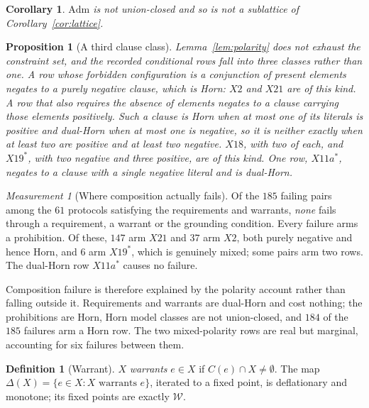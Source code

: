 \documentclass[11pt,reqno]{amsart}
\theoremstyle{plain}
\newtheorem{proposition}[theorem]{Proposition}
\newtheorem{corollary}[theorem]{Corollary}
\theoremstyle{definition}
\newtheorem{definition}[theorem]{Definition}
\theoremstyle{remark}
\newtheorem{measurement}[theorem]{Measurement}
\newcommand{\Admf}{\mathrm{Adm}}
\begin{document}
\begin{corollary}\label{cor:admnotlattice}
$\Admf$ is not union-closed and so is not a sublattice of
Corollary~\ref{cor:lattice}.
\end{corollary}

\begin{proposition}[A third clause class]\label{prop:mixed}
Lemma~\ref{lem:polarity} does not exhaust the constraint set, and the recorded
conditional rows fall into three classes rather than one. A row whose forbidden
configuration is a conjunction of present elements negates to a purely negative
clause, which is Horn: $X2$ and $X21$ are of this kind. A row that also requires
the \emph{absence} of elements negates to a clause carrying those elements
positively. Such a clause is Horn when at most one of its literals is positive
and dual-Horn when at most one is negative, so it is neither exactly when at
least two are positive and at least two negative. $X18$, with two of each, and
$X19^{*}$, with two negative and three positive, are of this kind. One row, $X11a^{*}$,
negates to a clause with a single negative literal and is dual-Horn.
\end{proposition}

\begin{measurement}[Where composition actually fails]\label{meas:whereitfails}
Of the $185$ failing pairs among the $61$ protocols satisfying the requirements
and warrants, \emph{none} fails through a requirement, a warrant or the
grounding condition. Every failure arms a prohibition. Of these, $147$ arm
$X21$ and $37$ arm $X2$, both purely negative and hence Horn, and $6$ arm
$X19^{*}$, which is genuinely mixed; some pairs arm two rows. The dual-Horn row
$X11a^{*}$ causes no failure.
\end{measurement}

Composition failure is therefore explained by the polarity account rather than
falling outside it. Requirements and warrants are dual-Horn and cost nothing;
the prohibitions are Horn, Horn model classes are not union-closed, and $184$ of
the $185$ failures arm a Horn row. The two mixed-polarity rows are real but
marginal, accounting for six failures between them.

\begin{definition}[Warrant]
$X$ \emph{warrants} $e \in X$ if $C(e) \cap X \neq \emptyset$. The map
$\Delta(X) = \{e \in X : X \text{ warrants } e\}$, iterated to a fixed point, is
deflationary and monotone; its fixed points are exactly $\mathcal{W}$.
\end{definition}
\end{document}
